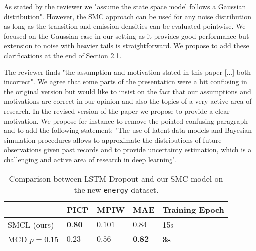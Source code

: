 \documentclass{article}
\begin{document}
As stated by the reviewer we "assume the state space model follows a Gaussian distribution".
However, the SMC approach can be used for any noise distribution as long as the transition and emission densities can be evaluated pointwise.%
We focused on the Gaussian case in our setting as it provides good performance but extension to noise with heavier tails is straightforward.
We propose to add these clarifications at the end of Section 2.1.

The reviewer finds "the assumption and motivation stated in this paper [...] both incorrect".
We agree that some parts of the presentation were a bit confusing in the original version but would like to insist on the fact that our assumptions and motivations are correct in our opinion and also the topics of a very active area of research.
In the revised version of the paper we propose to provide a clear motivation.
We propose for instance to remove the pointed confusing paragraph and to add  %
 the following statement: "The use of latent data models and Bayesian simulation procedures allows to approximate the distributions of future observations given past records and to provide uncertainty estimation, which is a challenging and active area of research in deep learning".%

\begin{table}[htpb]
	\centering
	\caption{Comparison between LSTM Dropout and our SMC model on the new \texttt{energy} dataset.}
	\label{tab:comparison}
	\begin{tabular}{lllll}
		\toprule
		             & PICP            & MPIW    & MAE             & Training Epoch \\
		\toprule
		SMCL (ours)  & $\textbf{0.80}$ & $0.101$ & $0.84$          & 15s            \\
		MCD $p=0.15$ & $0.23$          & $0.56$  & $\textbf{0.82}$ & \textbf{3s}    \\
		\bottomrule
	\end{tabular}
\end{table}
\end{document}
